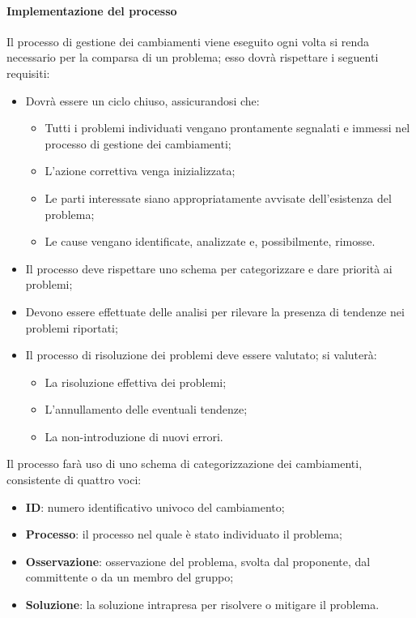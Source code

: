 \documentclass[../norme-di-progetto.tex]{subfiles}
\begin{document}
\paragraph{Implementazione del processo}
Il processo di gestione dei cambiamenti viene eseguito ogni volta si renda necessario per la comparsa di un problema; esso dovrà rispettare i seguenti requisiti:
\begin{itemize}
  \item Dovrà essere un ciclo chiuso, assicurandosi che:
  \begin{itemize}
    \item Tutti i problemi individuati vengano prontamente segnalati e immessi nel processo di gestione dei cambiamenti;
    \item L'azione correttiva venga inizializzata;
    \item Le parti interessate siano appropriatamente avvisate dell'esistenza del problema;
    \item Le cause vengano identificate, analizzate e, possibilmente, rimosse.
  \end{itemize}
  \item Il processo deve rispettare uno schema per categorizzare e dare priorità ai problemi;
  \item Devono essere effettuate delle analisi per rilevare la presenza di tendenze nei problemi riportati;
  \item Il processo di risoluzione dei problemi deve essere valutato; si valuterà:
  \begin{itemize}
    \item La risoluzione effettiva dei problemi;
    \item L'annullamento delle eventuali tendenze;
    \item La non-introduzione di nuovi errori.
  \end{itemize}
\end{itemize}
Il processo farà uso di uno schema di categorizzazione dei cambiamenti, consistente di quattro voci:
\begin{itemize}
  \item \textbf{ID}: numero identificativo univoco del cambiamento;
  \item \textbf{Processo}: il processo nel quale è stato individuato il problema;
  \item \textbf{Osservazione}: osservazione del problema, svolta dal proponente, dal committente o da un membro del gruppo;
  \item \textbf{Soluzione}: la soluzione intrapresa per risolvere o mitigare il problema.
\end{itemize}
\end{document}
